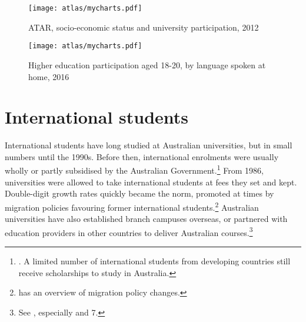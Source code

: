 \documentclass{grattan}
\begin{document}
    \begin{figure} %
    \caption{ATAR, socio-economic status and university participation, 2012}\label{fig:atar-socioeconomic-status-and-university-participation-2012}
    \units{}
    \texttt{[image: atlas/mycharts.pdf]}
    \end{figure}



    \begin{figure} %
    \caption{Higher education participation aged 18-20, by language spoken at home, 2016}\label{fig:higher-education-participation-aged-1820-by-language-spoken-at-home-2016}
    \texttt{[image: atlas/mycharts.pdf]}
    \end{figure}



%
\section{International students }\label{sec:international-students}

International students have long studied at Australian universities, but in small numbers until the 1990s. Before then, international enrolments were usually wholly or partly subsidised by the Australian Government.\footnote{\textcites[][]{Meadows2011fromaidtoindustr}[][]{Megarrity2007ahighlyregulated}. A limited number of international students from developing countries still receive scholarships to study in Australia.} From 1986, universities were allowed to take international students at fees they set and kept. Double-digit growth rates quickly became the norm, promoted at times by migration policies favouring former international students.\footnote{\textcite[][]{Spinks2016overseasstudents} has an overview of migration policy changes.} Australian universities have also established branch campuses overseas, or partnered with education providers in other countries to deliver Australian courses.\footnote{See \textcite[][]{Ziguras2015governingcrossbor}, especially  and 7.}
\end{document}
